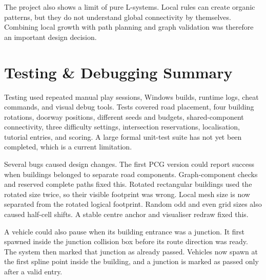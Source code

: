 \documentclass[10pt, a4paper, twocolumn]{article}
\begin{document}
The project also shows a limit of pure L-systems. Local rules can create organic patterns, but they do not understand global connectivity by themselves. Combining local growth with path planning and graph validation was therefore an important design decision.

\section{Testing \& Debugging Summary}

Testing used repeated manual play sessions, Windows builds, runtime logs, cheat commands, and visual debug tools. Tests covered road placement, four building rotations, doorway positions, different seeds and budgets, shared-component connectivity, three difficulty settings, intersection reservations, localisation, tutorial entries, and scoring. A large formal unit-test suite has not yet been completed, which is a current limitation.

Several bugs caused design changes. The first PCG version could report success when buildings belonged to separate road components. Graph-component checks and reserved complete paths fixed this. Rotated rectangular buildings used the rotated size twice, so their visible footprint was wrong. Local mesh size is now separated from the rotated logical footprint. Random odd and even grid sizes also caused half-cell shifts. A stable centre anchor and visualiser redraw fixed this.

A vehicle could also pause when its building entrance was a junction. It first spawned inside the junction collision box before its route direction was ready. The system then marked that junction as already passed. Vehicles now spawn at the first spline point inside the building, and a junction is marked as passed only after a valid entry.
\end{document}
